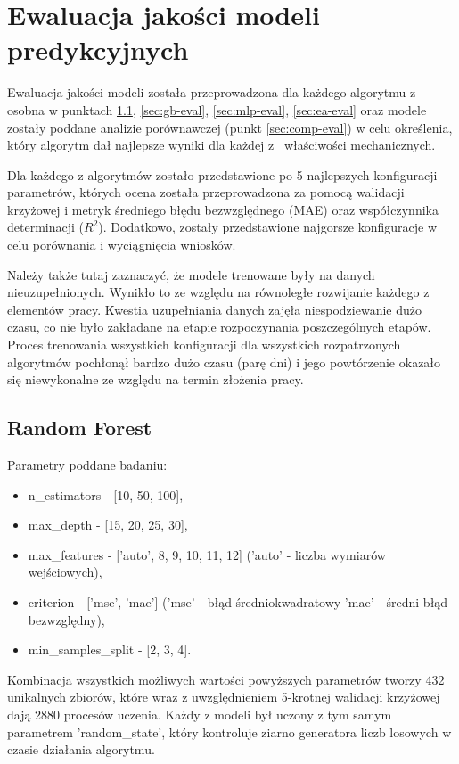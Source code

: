 \section{Ewaluacja jakości modeli predykcyjnych}\label{sec:models-eval}
Ewaluacja jakości modeli została przeprowadzona dla każdego algorytmu z osobna w punktach \ref{sec:rf-eval}, \ref{sec:gb-eval}, \ref{sec:mlp-eval}, \ref{sec:ea-eval} oraz modele zostały poddane analizie porównawczej (punkt \ref{sec:comp-eval}) w celu określenia, który algorytm dał najlepsze wyniki dla każdej z~ właściwości mechanicznych. 

Dla każdego z algorytmów zostało przedstawione po 5 najlepszych konfiguracji parametrów, których ocena została przeprowadzona za pomocą walidacji krzyżowej i metryk średniego błędu bezwzględnego (MAE) oraz współczynnika determinacji ($R^{2}$). Dodatkowo, zostały przedstawione najgorsze konfiguracje w celu porównania i wyciągnięcia wniosków. 

Należy także tutaj zaznaczyć, że modele trenowane były na danych nieuzupełnionych. Wynikło to ze względu na równoległe rozwijanie każdego z elementów pracy. Kwestia uzupełniania danych zajęła niespodziewanie dużo czasu, co nie było zakładane na etapie rozpoczynania poszczególnych etapów. Proces trenowania wszystkich konfiguracji dla wszystkich rozpatrzonych algorytmów pochłonął bardzo dużo czasu (parę dni) i jego powtórzenie okazało się niewykonalne ze względu na termin złożenia pracy.

\subsection{Random Forest}\label{sec:rf-eval}
Parametry poddane badaniu:
\begin{itemize}
    \item n\_estimators - [10, 50, 100],
    \item max\_depth - [15, 20, 25, 30],
    \item max\_features - ['auto', 8, 9, 10, 11, 12] ('auto' - liczba wymiarów wejściowych),
    \item criterion - ['mse', 'mae'] ('mse' - błąd średniokwadratowy 'mae' - średni błąd bezwzględny),
    \item min\_samples\_split - [2, 3, 4].
\end{itemize}

Kombinacja wszystkich możliwych wartości powyższych parametrów tworzy 432 unikalnych zbiorów, które wraz z uwzględnieniem 5-krotnej walidacji krzyżowej dają 2880 procesów uczenia. Każdy z modeli był uczony z tym samym parametrem 'random\_state', który kontroluje ziarno generatora liczb losowych w czasie działania algorytmu.

